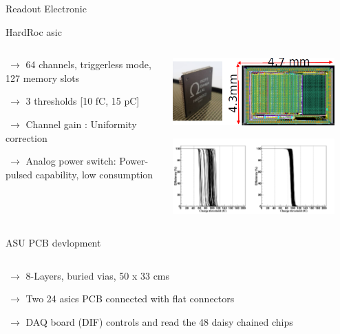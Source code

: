 \documentclass[10pt]{beamer}
\begin{document}
\begin{frame}[shrink=3]{Readout Electronic}
\begin{block}{HardRoc asic}
    \begin{columns}
      \begin{column}{0.5\textwidth}
        {\small 
          \par $ ~ \rightarrow$ 64 channels, triggerless mode, 127 memory slots
          \par $ ~\rightarrow$  3 thresholds [10 fC,  15 pC]
          \par $ ~\rightarrow$  Channel gain : Uniformity correction
          \par $ ~\rightarrow$  Analog power switch: Power-pulsed capability, low consumption

        }
      \end{column}

      \begin{column}{0.5\textwidth}
         \centerline{\includegraphics[width=0.9\textwidth]{images/HR2Chip}}
         \centerline{\includegraphics[width=0.9\textwidth]{images/HR2GainAdjustement}}
      \end{column}

    \end{columns}
\end{block}
\pause
\begin{block}{ASU PCB devlopment}
    \begin{columns}
      \begin{column}{0.5\textwidth}
        {\small 
          \par $ ~ \rightarrow$ 8-Layers, buried vias, 50 x 33 cms
          \par $ ~\rightarrow$  Two 24 asics PCB connected with flat connectors
          \par $ ~\rightarrow$  DAQ board (DIF) controls and read the 48 daisy chained chips
        }
      \end{column}


\end{columns}
\end{block}
\end{frame}
\end{document}
